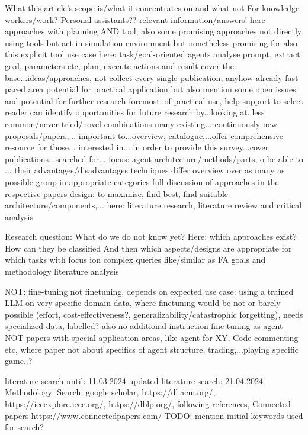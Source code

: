 \documentclass{article}
\begin{document}
What this article's scope is/what it concentrates on and what not
For knowledge workers/work?
Personal assistants??
relevant information/answers!
here approaches with planning AND tool, also some promising approaches not directly using tools but act in simulation environment but nonetheless promising for also this explicit tool use case
here: task/goal-oriented agents
analyse prompt, extract goal, parameters etc, plan, execute actions and result
cover the base...ideas/approaches, not collect every single publication, anyhow already fast paced area
potential for practical application
but also mention some open issues and potential for further research
foremost..of practical use, help support to select
reader can identify opportunities for future research by...looking at..less common/never tried/novel combinations
many existing... continuously new proposals/papers,...
important to...overview, catalogue,...offer comprehensive resource for those... interested in...
in order to provide this survey...cover publications...searched for...
focus: agent architecture/methods/parts, o be able to ... their advantages/disadvantages
techniques differ
overview over as many as possible
group in appropriate categories
full discussion of approaches in the respective papers
design: to maximise, find best, find suitable architecture/components,...
here: literature research, literature review and critical analysis

Research question: What do we do not know yet?
Here: which approaches exist? How can they be classified
And then which aspects/designs are appropriate for which tasks with focus ion complex queries like/similar as FA 
goals and methodology
literature analysis

NOT:
fine-tuning
not finetuning, depends on expected use case: using a trained LLM on very specific domain data, where finetuning would be not or barely possible (effort, cost-effectiveness?, generalizability/catastrophic forgetting), needs specialized data, labelled?
also no additional instruction fine-tuning as agent
NOT papers with special application areas, like agent for XY, Code commenting etc, where paper not about specifics of agent structure, trading,...playing specific game..?

literature search until: 11.03.2024
updated literature search: 21.04.2024
Methodology:
Search: google scholar, https://dl.acm.org/, https://ieeexplore.ieee.org/, https://dblp.org/, following references, Connected papers https://www.connectedpapers.com/
TODO: mention initial keywords used for search?
\end{document}
